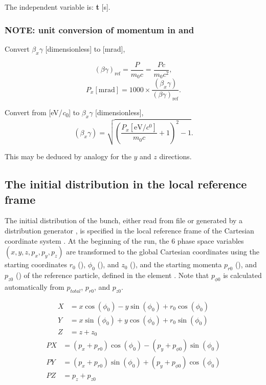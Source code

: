 The independent variable is: \textbf{t} [\si{\second}].


\subsubsection{NOTE: unit conversion of momentum in \opalt and \opalcycl}
Convert $\beta_x \gamma$ [dimensionless] to [\si{\milli\radian}],

\begin{equation}
\label{eq:betagamma1}
(\beta\gamma)_{\text{ref}}=\frac{P}{m_0c}=\frac{Pc}{m_0c^2},
\end{equation}
\begin{equation}
\label{eq:betagamma2}
P_x[\si{\milli\radian}]=1000\times\frac{(\beta_x\gamma)}{(\beta\gamma)_{\text{ref}}}.
\end{equation}

Convert from [\si{\electronvolt/\clight}] to $\beta_x\gamma$ [dimensionless],
\begin{equation}
\label{eq:eVtobetagamma}
(\beta_x\gamma)=\sqrt{(\frac{P_x[\si{\electronvolt/\clight}]}{m_0c}+1)^2-1}.
\end{equation}

This may be deduced by analogy for the $y$ and $z$ directions.

\subsection{The initial distribution in the local reference frame }
\label{sec:opalcycl:localframe}
The initial distribution of the bunch,
either read from file or generated by a distribution generator ,
is specified in the local reference frame of the \opalcycl Cartesian coordinate system .
At the beginning of the run, the 6 phase space variables \((x, y, z, p_x, p_y, p_z)\)
are transformed to the global Cartesian coordinates using the starting coordinates $r_0$ (), $\phi_0$ (), and $z_0$ (),
and the starting momenta $p_{r0}$ (), and $p_{z0}$ () of the reference particle, defined
in the  element . Note that $p_{\phi 0}$ is calculated
automatically from $p_{total}$, $p_{r0}$, and $p_{z0}$.

\begin{align*}
X &= x\cos(\phi_0) - y\sin(\phi_0) + r_0\cos(\phi_0)  \\
Y &= x\sin(\phi_0) + y\cos(\phi_0) + r_0\sin(\phi_0)  \\
Z &= z + z_0
\end{align*}
\begin{align*}
PX &= (p_x+p_{r0})\cos(\phi_0) - (p_y+p_{\phi 0})\sin(\phi_0) \\
PY &= (p_x+p_{r0})\sin(\phi_0) + (p_y+p_{\phi 0})\cos(\phi_0) \\
PZ &= p_z + p_{z0}
\end{align*}


